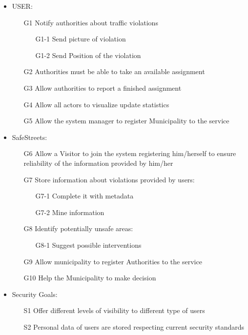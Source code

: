 \begin{itemize}
\item	USER:
\begin{itemize}
\item[G1] Notify authorities about traffic violations
\begin{itemize}
\item[G1-1] Send picture of violation
\item[G1-2] Send Position of the violation
\end{itemize}
\item[G2]Authorities must be able to take an available assignment
\item[G3] Allow authorities to report a finished assignment
\item[G4]Allow all actors to visualize update statistics
\item[G5] Allow the system manager to register Municipality to the service
\end{itemize}
\item	SafeStreets:
\begin{itemize}
\item[G6] Allow a Visitor to join the system registering him/herself to ensure reliability of the information provided by him/her
\item[G7] Store information about violations provided by users:
\begin{itemize}
\item[G7-1] Complete it with metadata
\item[G7-2] Mine information
\end{itemize}
\item[G8] Identify potentially unsafe areas:
\begin{itemize}
\item[G8-1] Suggest possible interventions
\end{itemize}
\item[G9] Allow municipality to register Authorities to the service
\item[G10] Help the Municipality to make decision
\end{itemize}
\item	Security Goals:
\begin{itemize}
\item[S1] Offer different levels of visibility to different type of users
\item[S2] Personal data of users are stored respecting current security standards
\end{itemize}
\end{itemize}
